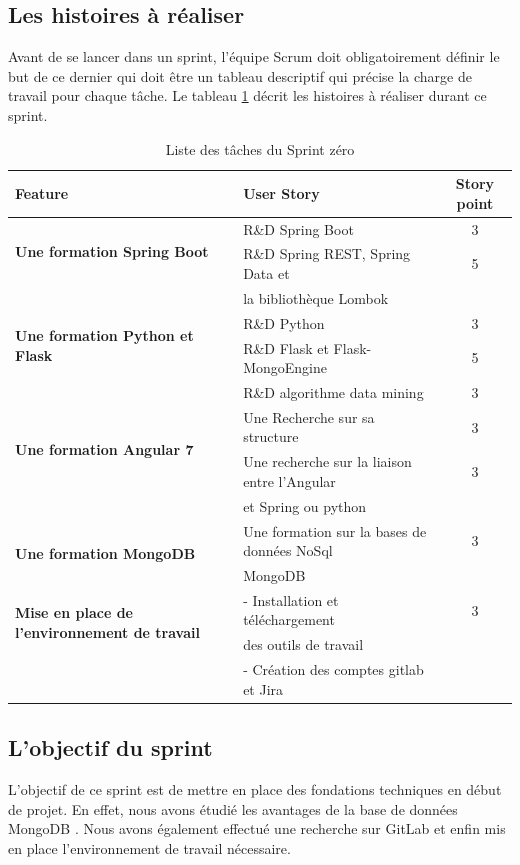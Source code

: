 \subsection{Les histoires à réaliser}
Avant de se lancer dans un sprint, l'équipe Scrum doit obligatoirement définir le but de ce dernier qui doit être un tableau descriptif qui précise la charge de travail pour chaque tâche. Le tableau \ref{tab:sprint_0_backlog} décrit les histoires à réaliser durant ce sprint.
\newpage
\begin{table}[!ht]
    \center
\begin{tabular}{|l|l|c|}
\hline
{\textbf{Feature}} & {\textbf{User Story}} & {\textbf{Story point}}\\
\hline
\multirow{2}{3cm}{\textbf{ Une formation Spring Boot}} &  R\&D Spring Boot & 3 \\
\cline{2-3}
& R\&D Spring REST, Spring Data et & 5\\&la bibliothèque Lombok & \\
\hline
\multirow{2}{3cm}{\textbf{ Une formation Python et Flask}} & R\&D Python   & 3 \\
\cline{2-3}
& R\&D Flask et Flask-MongoEngine  & 5 \\
\cline{2-3}
&  R\&D algorithme data mining & 3 \\
\hline
\multirow{2}{4cm}{\textbf{Une formation Angular 7}} & Une Recherche sur sa structure   &  3\\
\cline{2-3}
& Une recherche sur la liaison entre l’Angular & 3 \\
&et Spring ou python &\\

\hline
\multirow{2}{4cm}{\textbf{Une formation MongoDB }} & Une formation sur la bases de données NoSql  & 3\\
& MongoDB &\\
\hline
\multirow{2}{4cm}{\textbf{Mise en place de l’environnement de travail}} 
&- Installation et téléchargement  &3\\ 
&  des outils de travail &  \\
& - Création des comptes gitlab et Jira & \\
\hline
\end{tabular}
\caption{Liste des tâches du Sprint zéro}
\label{tab:sprint_0_backlog}
\end{table}

\subsection{L'objectif du sprint}
L'objectif de ce sprint est de mettre en place des fondations techniques en début de projet. En effet, nous avons étudié les avantages de la base de données MongoDB . Nous avons également effectué une recherche sur GitLab et enfin mis en place l'environnement de travail nécessaire.
